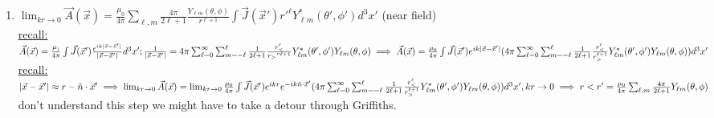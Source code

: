 \documentclass[12pt]{amsart}
\begin{document}
\begin{enumerate}
\hdashrule[0.5ex][c]{\linewidth}{0.5pt}{1.5mm}


\item \underline{$\lim_{kr \rightarrow 0} \vec{A} ( \vec{x}) = \frac{\mu_0}{4 \pi} \sum_{\ell, m} \frac{4 \pi}{2 \ell + 1} \frac{Y_{\ell m} ( \theta, \phi)}{r^{\ell + 1}} \int \vec{J} ( \vec{x}') r'^{\ell} Y_{\ell m}^* ( \theta', \phi') d^3 x'$} (near field)\\
\underline{recall:} $\vec{A} ( \vec{x}) = \frac{\mu_)}{4 \pi} \int \vec{J} ( \vec{x}') \frac{e^{i k | \vec{x} - \vec{x}'|}}{ | \vec{x} - \vec{x}'|} d^3 x';\\
\frac{1}{| \vec{x} - \vec{x}'|} = 4 \pi \sum_{\ell = 0}^{\infty} \sum_{m= - \ell}^{\ell} \frac{1}{2 \ell + 1} \frac{r_<^{\ell}}{r_>"^{\ell+1}} Y_{\ell m}^*(\theta', \phi') Y_{\ell m} ( \theta, \phi)\\
\implies \vec{A} ( \vec{x}) = \frac{\mu_0}{4 \pi} \int \vec{J} ( \vec{x}') e^{i k | \vec{x} - \vec{x}'|} (4 \pi \sum_{\ell = 0}^{\infty} \sum_{m= - \ell}^{\ell} \frac{1}{2 \ell + 1} \frac{r_<^{\ell}}{r_>^{\ell+1}} Y_{\ell m}^* ( \theta', \phi') Y_{\ell m} ( \theta, \phi)) d^3 x'\\$
\underline{recall:} $| \vec{x} - \vec{x}' | \approx r - \hat{n} \cdot \vec{x}'\\
\implies \lim_{kr \rightarrow 0} \vec{A} ( \vec{x}) = \lim_{kr \rightarrow 0} \frac{\mu_0}{4 \pi} \int \vec{J} ( \vec{x}') e^{ik r} e^{- i k \hat{n} \cdot \vec{x}'}(4 \pi \sum_{\ell = 0}^{\infty} \sum_{m= - \ell}^{\ell} \frac{1}{2 \ell + 1} \frac{r_<^{\ell}}{r_>^{\ell + 1}} Y_{\ell m}^* ( \theta', \phi' ) Y_{\ell m} ( \theta, \phi)) d^3 x', k r \rightarrow 0 \implies r< r'\\
= \frac{\mu_0}{4 \pi} \sum_{\ell, m} \frac{4 \pi}{2 \ell + 1} Y_{\ell m}( \theta, \phi)\\$
don't understand this step we might have to take a detour through Griffiths.


\end{enumerate}
\end{document}
